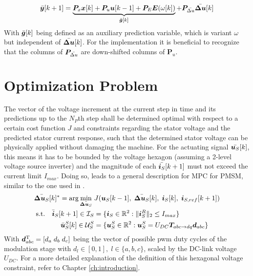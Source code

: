 \begin{equation}
	\Bar{\bm{y}}[k+1] = \underbrace{ \bm{P}_{x} {{\bm{x}}}[k] + \bm{P}_u \bm{u}[k-1] + \bm{P}_{E}\bm{E}(\omega[k]) }_{\Bar{\bm{g}}[k]} + \bm{P}_{\Bar{\Delta u}} \Bar{\bm{\Delta u}}[k]
	\label{equ:2_prediction}
\end{equation}
With $\Bar{\bm{g}}[k]$ being defined as an auxiliary prediction variable, which is variant $\omega$ but independent of $\Bar{\bm{\Delta u}}[k]$. For the implementation it is beneficial to recognize that the columns of $\bm{P}_{\Bar{\Delta u}}$ are down-shifted columns of $\bm{P}_u$.


\section{Optimization Problem} \label{sec:2_op}
The vector of the voltage increment at the current step in time and its predictions up to the $N_P$th step shall be determined optimal with respect to a certain cost function $J$ and constraints regarding the stator voltage and the predicted stator current response, such that the determined stator voltage can be physically applied without damaging the machine. For the actuating signal $\Bar{\bm{u}_S}[k]$, this means it has to be bounded by the voltage hexagon (assuming a 2-level voltage source inverter) and the magnitude of each $\Bar{\bm{i}_S}[k+1]$ must not exceed the current limit $I_{max}$. Doing so, leads to a general description for MPC for PMSM, similar to the one used in \cite{TOMPFC1}.
\begin{align*}
	\Bar{\bm{\Delta u}_S}[k]^* = \arg \min_{\Bar{\bm{\Delta  u}_S}}\; &J(\boldsymbol{u}_{S}[k-1],\; \Bar{\bm{\Delta u}_S}[k], \; \boldsymbol{i}_{S}[k],\;  \boldsymbol{i}_{S,ref}[k+1])\\
	 \text{s.t.} \quad \bar{\boldsymbol{i}}_{S}[k+1] \in \mathcal{I}_S &= \{\boldsymbol{i}_{S} \in \mathbb{R}^2 :\|\boldsymbol{i}_{S}^R\|_2 \leq {I}_{max} \} \\
	  \bar{\boldsymbol{u}}_{S}^S[k] \in \mathcal{U}_{S}^S &= \{ \boldsymbol{u}_{S}^S \in \mathbb{R}^2 : \boldsymbol{u}_{S}^S = U_{DC} \boldsymbol{T}_{abc\rightarrow dq} \boldsymbol{d}_{abc} \}
\end{align*}
With $\bm{d}_{abc}^{\mathrm{T}} = [d_a\;d_b\; d_c]$ being the vector of possible \acrshort{pwm} duty cycles of the modulation stage with $d_l\in [0,1], \; l \in \{a,b,c\}$, scaled by the DC-link voltage $U_{DC}$. For a more detailed explanation of the definition of this hexagonal voltage constraint, refer to Chapter \ref{ch:introduction}.\\

